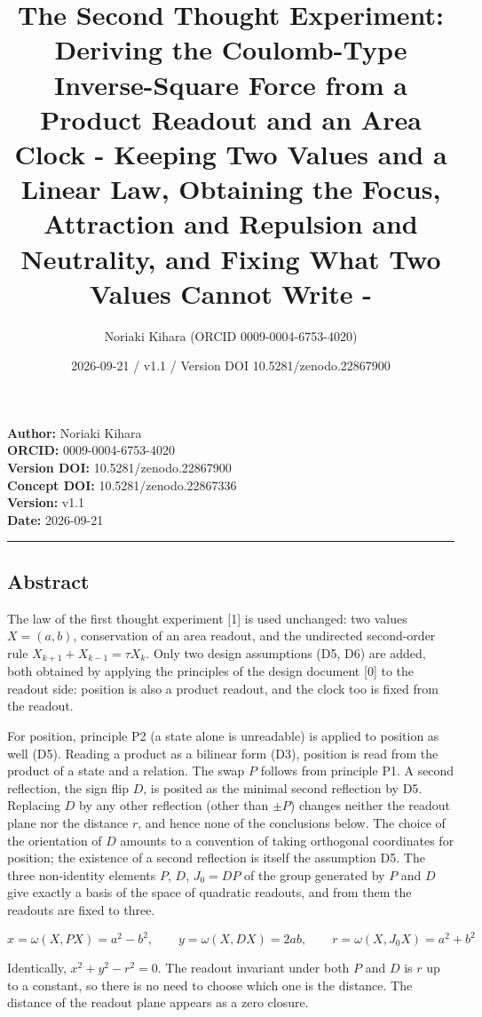 \documentclass[
  a4paper,
]{article}
\title{The Second Thought Experiment: Deriving the Coulomb-Type
Inverse-Square Force from a Product Readout and an Area Clock - Keeping
Two Values and a Linear Law, Obtaining the Focus, Attraction and
Repulsion and Neutrality, and Fixing What Two Values Cannot Write -}
\author{Noriaki Kihara (ORCID 0009-0004-6753-4020)}
\date{2026-09-21 / v1.1 / Version DOI 10.5281/zenodo.22867900}
\newcounter{none} %
\begin{document}
\maketitle

\textbf{Author:} Noriaki Kihara\\
\textbf{ORCID:} 0009-0004-6753-4020\\
\textbf{Version DOI:} 10.5281/zenodo.22867900\\
\textbf{Concept DOI:} 10.5281/zenodo.22867336\\
\textbf{Version:} v1.1\\
\textbf{Date:} 2026-09-21

\begin{center}\rule{0.5\linewidth}{0.5pt}\end{center}

\subsection{Abstract}\label{abstract}

The law of the first thought experiment {[}1{]} is used unchanged: two
values \(X=(a,b)\), conservation of an area readout, and the undirected
second-order rule \(X_{k+1}+X_{k-1}=\tau X_k\). Only two design
assumptions (D5, D6) are added, both obtained by applying the principles
of the design document {[}0{]} to the readout side: position is also a
product readout, and the clock too is fixed from the readout.

For position, principle P2 (a state alone is unreadable) is applied to
position as well (D5). Reading a product as a bilinear form (D3),
position is read from the product of a state and a relation. The swap
\(P\) follows from principle P1. A second reflection, the sign flip
\(D\), is posited as the minimal second reflection by D5. Replacing
\(D\) by any other reflection (other than \(\pm P\)) changes neither the
readout plane nor the distance \(r\), and hence none of the conclusions
below. The choice of the orientation of \(D\) amounts to a convention of
taking orthogonal coordinates for position; the existence of a second
reflection is itself the assumption D5. The three non-identity elements
\(P\), \(D\), \(J_0=DP\) of the group generated by \(P\) and \(D\) give
exactly a basis of the space of quadratic readouts, and from them the
readouts are fixed to three.

\[
x=\omega(X,PX)=a^2-b^2,\qquad y=\omega(X,DX)=2ab,\qquad r=\omega(X,J_0X)=a^2+b^2
\]

Identically, \(x^2+y^2-r^2=0\). The readout invariant under both \(P\)
and \(D\) is \(r\) up to a constant, so there is no need to choose which
one is the distance. The distance of the readout plane appears as a zero
closure.
\end{document}

